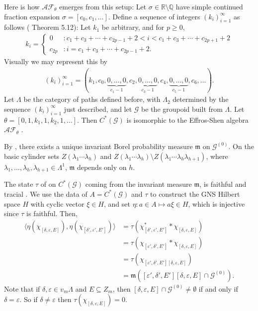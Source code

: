 \documentclass[12pt]{amsart}
\newcommand{\sm}{\setminus}
\newcommand{\sse}{\subseteq}
\newcommand{\AF}{\mathcal{A}\mathcal{F}}
\newcommand{\mc}[1]{\mathcal{#1}}
\newcommand{\mf}[1]{\mathfrak{#1}}
\newcommand{\emp}{\emptyset}
\newcommand{\Q}{\mathbb{Q}}
\newcommand{\R}{\mathbb{R}}
\newcommand{\de}{\delta}
\newcommand{\ep}{\varepsilon}
\newcommand{\la}{\lambda}
\newcommand{\La}{\Lambda}
\theoremstyle{plain} %
\theoremstyle{definition} %
\begin{document}


Here is how $\AF_{\theta}$ emerges from this setup: Let $\sigma \in \R \sm \Q$ have simple continued fraction expansion $\sigma = [c_0, c_1, \dots]$. Define a sequence of integers $(k_i)_{i=1}^{\infty}$ as follows (\cite{MS22} Theorem 5.12): Let $k_1$ be arbitrary, and for $p\geq 0$,
\begin{align*}
    k_i = \begin{cases}
        0 &: c_1 + c_3 + \cdots + c_{2p-1} + 2 < i < c_1 + c_3 + \cdots + c_{2p+1} + 2\\
        c_{2p} &: i = c_1 + c_3 + \cdots + c_{2p-1} + 2.
    \end{cases}
\end{align*}
Visually we may represent this by
\begin{align*}
    (k_i)_{i=1}^{\infty} = (k_1, c_0, \underbrace{0, \dots, 0}_{c_1 - 1}, c_2,  \underbrace{0, \dots, 0}_{c_3 - 1}, c_4, \underbrace{0, \dots, 0}_{c_5 - 1}, c_6, \dots).
\end{align*}
Let $\Lambda$ be the category of paths defined before, with $\Lambda_2$ determined by the sequence $(k_i)_{i=1}^{\infty}$ just described, and let $\mc{G}$ be the groupoid built from $\Lambda.$ Let $\theta = [0, 1, k_1, 1, k_2, 1, \dots]$. Then $C^*(\mc{G})$ is isomorphic to the Effros-Shen algebra $\AF_{\theta}$ \cite[ Theorem 7.2]{MS22}.

By \cite[Lemma 6.8 and Theorem 6.10]{MS22}, there exists a unique invariant Borel probability measure $\mf{m}$ on $\mc{G}^{(0)}$. On the basic cylinder sets $Z(\la_1 \cdots \la_h)$ and $Z(\la_1 \cdots \la_h) \sm Z(\la_1 \cdots \la_h \la_{h+1})$, where $\la_1, \dots, \la_h, \la_{h+1}\in \La^1$, $\mf{m}$ depends only on $h$. 

The state $\tau$ of \cite[Theorem 7.10]{MS22} on $C^*(\mc{G})$ coming from the invariant measure $\mf{m}$, is faithful and tracial \cite[Theorem 7.10]{MS22}. We use the data of $A = C^*(\mc{G})$ and $\tau$ to construct  the GNS Hilbert space $H$ with cyclic vector $\xi \in H$, and set $\eta: a \in A \mapsto a\xi \in H$, which is injective since $\tau$ is faithful. Then,
\begin{equation}
\begin{split}\label{inner-product-formula}
        \langle \eta(\chi_{[\de, \ep, E]}), \eta(\chi_{[\de', \ep', E']})\rangle &= \tau(\chi_{[\de', \ep', E']}^* * \chi_{[\de, \ep, E]})\\
        &= \tau(\chi_{[\ep', \de', E']} * \chi_{[\de, \ep, E]})\\
        &= \tau (\chi_{[\ep', \de', E'][\de, \ep, E]})\\
        &= \mf{m}([\ep', \de', E'][\de, \ep, E] \cap \mc{G}^{(0)}).
\end{split}
\end{equation}
Note that if $\de, \ep \in v_m \La$ and $E \sse Z_m$, then $[\de, \ep, E] \cap \mc{G}^{(0)} \neq \emp$ if and only if $\de = \ep$. So if $\de \neq \ep$ then $\tau(\chi_{[\de, \ep, E]}) = 0$.
\end{document}
